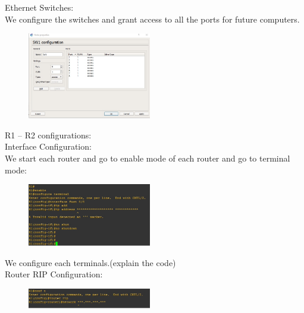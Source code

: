 \documentclass{article}
\begin{document}
Ethernet Switches:\\
We configure the switches and grant access to all the ports for future computers.

\begin{figure}[H]
	\begin{center}
		\includegraphics[width=0.48\textwidth]{Switchconf.jpg}
	\end{center}
	\caption{\small  \newline}
	\label{fig:Prd}
\end{figure}

R1 – R2 configurations:\\
Interface Configuration:\\
We start each router and go to enable mode of each router and go to terminal mode:

\begin{figure}[H]
	\begin{center}
		\includegraphics[width=0.48\textwidth]{Terminalconf.jpg}
	\end{center}
	\caption{\small  \newline}
	\label{fig:Prd}
\end{figure}

We configure each terminals.(explain the code)\\

Router RIP Configuration:

\begin{figure}[H]
	\begin{center}
		\includegraphics[width=0.48\textwidth]{RouterRip.jpg}
	\end{center}
	\caption{\small  \newline}
	\label{fig:Prd}
\end{figure}
\end{document}
